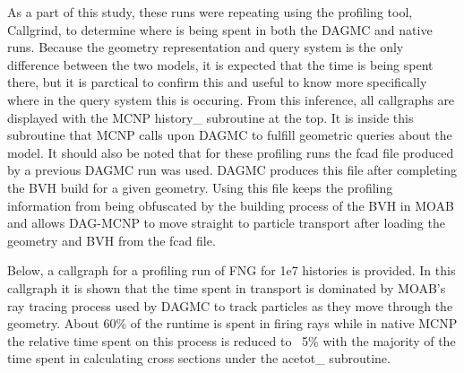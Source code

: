\documentclass[12pt, a4paper]{article}
\begin{document}
As a part of this study, these runs were repeating using the profiling tool, Callgrind, to determine where is being spent in both the DAGMC and native runs. Because the geometry representation and query system is the only difference between the two models, it is expected that the time is being spent there, but it is parctical to confirm this and useful to know more specifically where in the query system this is occuring. From this inference, all callgraphs are displayed with the MCNP history\_ subroutine at the top. It is inside this subroutine that MCNP calls upon DAGMC to fulfill geometric queries about the model. It should also be noted that for these profiling runs the fcad file produced by a previous DAGMC run was used. DAGMC produces this file after completing the BVH build for a given geometry. Using this file keeps the profiling information from being obfuscated by the building process of the BVH in MOAB and allows DAG-MCNP to move straight to particle transport after loading the geometry and BVH from the fcad file. 

Below, a callgraph for a profiling run of FNG for 1e7 histories is provided. In this callgraph it is shown that the time spent in transport is dominated by MOAB's ray tracing process used by DAGMC to track particles as they move through the geometry. About 60\% of the runtime is spent in firing rays while in native MCNP the relative time spent on this process is reduced to ~5\% with the majority of the time spent in calculating cross sections under the acetot\_ subroutine. 
\end{document}
